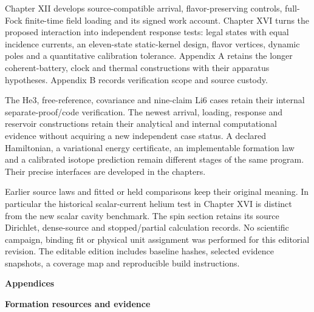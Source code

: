 Chapter XII develops source-compatible arrival, flavor-preserving controls,
full-Fock finite-time field loading and its signed work account. Chapter XVI
turns the proposed interaction into independent response tests: legal states
with equal incidence currents, an eleven-state static-kernel design, flavor
vertices, dynamic poles and a quantitative calibration tolerance. Appendix A
retains the longer coherent-battery, clock and thermal constructions with
their apparatus hypotheses. Appendix B records verification scope and source
custody.

The He3, free-reference, covariance and nine-claim Li6 cases retain their
internal separate-proof/code verification. The newest arrival, loading,
response and reservoir constructions retain their analytical and internal
computational evidence without acquiring a new independent case status.
A declared Hamiltonian, a variational energy certificate, an implementable
formation law and a calibrated isotope prediction remain different stages
of the same program. Their precise interfaces are developed in the chapters.

Earlier source laws and fitted or held comparisons keep their original
meaning. In particular the historical scalar-current helium test in
Chapter XVI is distinct from the new scalar cavity benchmark. The spin
section retains its source Dirichlet, dense-source and stopped/partial
calculation records. No scientific campaign, binding fit or physical unit
assignment was performed for this editorial revision. The editable edition
includes baseline hashes, selected evidence snapshots, a coverage map and
reproducible build instructions.




















\clearpage\onecolumn{}
\vspace*{\fill}\begin{center}{\Large\bfseries Appendices\par}\vspace{0.4in}
{\LARGE\bfseries Formation resources and evidence\par}\end{center}\vfill\clearpage
\appendix
\renewcommand{\thesection}{\Alph{section}}


\clearpage\onecolumn{}


